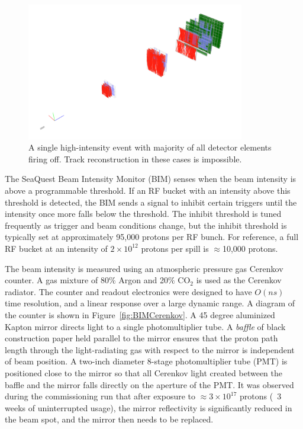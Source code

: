 \begin{figure}
	\begin{center}
		\includegraphics[width=0.85\textwidth]{figures/splat1.png}
		\caption{A single high-intensity event with majority of all detector elements firing off. Track reconstruction in
				 these cases is impossible.}
		\label{fig:splat}
	\end{center}
\end{figure}

The SeaQuest Beam Intensity Monitor (BIM) senses when the beam intensity is above a programmable threshold.
If an RF bucket with an intensity above this threshold is detected, the BIM sends a signal to inhibit
certain triggers until the intensity once more falls below the threshold. The inhibit threshold is tuned
frequently as trigger and beam conditions change, but the inhibit threshold is typically set at approximately
95,000 protons per RF bunch. For reference, a full RF bucket at an intensity of $2\times 10^{12}$ protons per
spill is $\approx$10,000 protons.

The beam intensity is measured using an atmospheric pressure gas Cerenkov counter. A gas mixture of 80$\%$ Argon and 20$\%$ CO$_2$
is used as the Cerenkov radiator. The counter and readout electronics were designed to have $O(ns)$ time resolution, and a linear
response over a large dynamic range.  A diagram of the counter is shown in Figure~\ref{fig:BIMCerenkov}.  A 45 degree aluminized
Kapton mirror directs light to a single photomultiplier tube.  A \emph{baffle} of black construction paper held parallel to the
mirror ensures that the proton path length through the light-radiating gas with respect to the mirror is independent of beam
position. A two-inch diameter 8-stage photomultiplier tube (PMT) is positioned close to the mirror so that all Cerenkov light created between the baffle and the mirror falls directly on the aperture of the PMT. It was observed during the commissioning run
that after exposure to $\approx 3 \times 10^{17}$ protons (~3 weeks of uninterrupted usage), the mirror reflectivity is significantly reduced in the beam spot, and the mirror then needs to be replaced.

